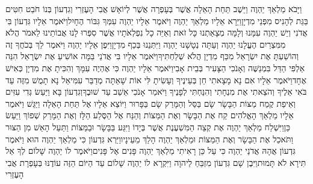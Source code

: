 \documentclass[../main/main.tex]{subfiles}
\begin{document}
\begin{multicols*}{\ncols}
וַיָּבֹא מַלְאַךְ יַהְוֶה וַיֵּשֶׁב תַּחַת הָאֵלָה אֲשֶׁר בְּעָפְרָה אֲשֶׁר לְיוֹאָשׁ אֲבִי הָעֶזְרִי וְגִדְעוֹן בְּנוֹ חֹבֵט חִטִּים בַּגַּת לְהָנִיס מִפְּנֵי מִדְיָן\PreVerseSpace{}וַיֵּרָא אֵלָיו מַלְאַךְ יַהְוֶה וַיֹּאמֶר אֵלָיו יַהְוֶה עִמְּךָ גִּבּוֹר הֶחָיִל\PreVerseSpace{}וַיֹּאמֶר אֵלָיו גִּדְעוֹן בִּי אֲדֹנִי וְיֵשׁ יַהְוֶה עִמָּנוּ וְלָמָּה מְצָאַתְנוּ כָּל זֹאת וְאַיֵּה כָל נִפְלְאֹתָיו אֲשֶׁר סִפְּרוּ לָנוּ אֲבוֹתֵינוּ לֵאמֹר הֲלֹא מִמִּצְרַיִם הֶעֱלָנוּ יַהְוֶה וְעַתָּה נְטָשָׁנוּ יַהְוֶה וַיִּתְּנֵנוּ בְּכַף מִדְיָן\PreVerseSpace{}וַיִּפֶן אֵלָיו יַהְוֶה וַיֹּאמֶר לֵךְ בְּכֹחֲךָ זֶה וְהוֹשַׁעְתָּ אֶת יִשְׂרָאֵל מִכַּף מִדְיָן הֲלֹא שְׁלַחְתִּיךָ\PreVerseSpace{}וַיֹּאמֶר אֵלָיו בִּי אֲדֹנַי בַּמָּה אוֹשִׁיעַ אֶת יִשְׂרָאֵל הִנֵּה אַלְפִּי הַדַּל בִּמְנַשֶּׁה וְאָנֹכִי הַצָּעִיר בְּבֵית אָבִי\PreVerseSpace{}וַיֹּאמֶר אֵלָיו יַהְוֶה כִּי אֶהְיֶה עִמָּךְ וְהִכִּיתָ אֶת מִדְיָן כְּאִישׁ אֶחָד\PreVerseSpace{}וַיֹּאמֶר אֵלָיו אִם נָא מָצָאתִי חֵן בְּעֵינֶיךָ וְעָשִׂיתָ לִּי אוֹת שָׁאַתָּה מְדַבֵּר עִמִּי\PreVerseSpace{}אַל נָא תָמֻשׁ מִזֶּה עַד בֹּאִי אֵלֶיךָ וְהֹצֵאתִי אֶת מִנְחָתִי וְהִנַּחְתִּי לְפָנֶיךָ וַיֹּאמַר אָנֹכִי אֵשֵׁב עַד שׁוּבֶךָ\PreVerseSpace{}וְגִדְעוֹן בָּא וַיַּעַשׂ גְּדִי עִזִּים וְאֵיפַת קֶמַח מַצּוֹת הַבָּשָׂר שָׂם בַּסַּל וְהַמָּרַק שָׂם בַּפָּרוּר וַיּוֹצֵא אֵלָיו אֶל תַּחַת הָאֵלָה וַיַּגַּשׁ \ClosedSection{}וַיֹּאמֶר אֵלָיו מַלְאַךְ הָאֱלֹהִים קַח אֶת הַבָּשָׂר וְאֶת הַמַּצּוֹת וְהַנַּח אֶל הַסֶּלַע הַלָּז וְאֶת הַמָּרַק שְׁפוֹךְ וַיַּעַשׂ כֵּן\PreVerseSpace{}וַיִּשְׁלַח מַלְאַךְ יַהְוֶה אֶת קְצֵה הַמִּשְׁעֶנֶת אֲשֶׁר בְּיָדוֹ וַיִּגַּע בַּבָּשָׂר וּבַמַּצּוֹת וַתַּעַל הָאֵשׁ מִן הַצּוּר וַתֹּאכַל אֶת הַבָּשָׂר וְאֶת הַמַּצּוֹת וּמַלְאַךְ יַהְוֶה הָלַךְ מֵעֵינָיו\PreVerseSpace{}וַיַּרְא גִּדְעוֹן כִּי מַלְאַךְ יַהְוֶה הוּא \ClosedSection{}וַיֹּאמֶר גִּדְעוֹן אֲהָהּ אֲדֹנַי יַהְוֶה כִּי עַל כֵּן רָאִיתִי מַלְאַךְ יַהְוֶה פָּנִים אֶל פָּנִים\PreVerseSpace{}וַיֹּאמֶר לוֹ יַהְוֶה שָׁלוֹם לְךָ אַל תִּירָא לֹא תָּמוּת\PreVerseSpace{}וַיִּבֶן שָׁם גִּדְעוֹן מִזְבֵּחַ לַיהוָה וַיִּקְרָא לוֹ יַהְוֶה שָׁלוֹם עַד הַיּוֹם הַזֶּה עוֹדֶנּוּ בְּעָפְרָת אֲבִי הָעֶזְרִי\OpenSection{}\par

\end{multicols*}
\end{document}
